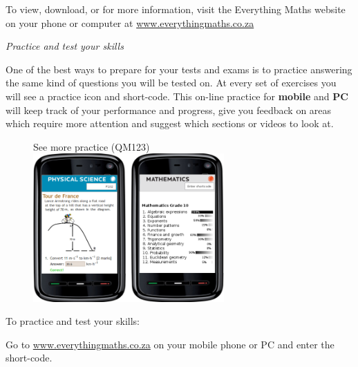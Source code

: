 \newpage
\thispagestyle{empty}
{

To view, download, or for more information, visit the Everything Maths website on your phone or
computer at \underline{www.everythingmaths.co.za}  \par
\vspace*{1cm}
{\normalfont\sffamily\fontsize{22}\normalfont\itshape Practice and test your skills} \par


One of the best ways to prepare for your tests and exams is to practice answering the same kind of
questions you will be tested on. At every set of exercises you will see a practice icon and short-code.
This on-line practice for \textbf{mobile} and \textbf{PC} will keep track of your performance and progress, give you
feedback on areas which require more attention and suggest which sections or videos to look at.

\begin{figure}[h]
\begin{center}
See more practice  (QM123)\\ 
\includegraphics[width=0.65\textwidth]{title_images/practicephones.png}
\end{center}
\end{figure}
\par



To practice and test your skills:\par

Go to \underline{www.everythingmaths.co.za} on your mobile phone or PC and enter the short-code.\par

}
